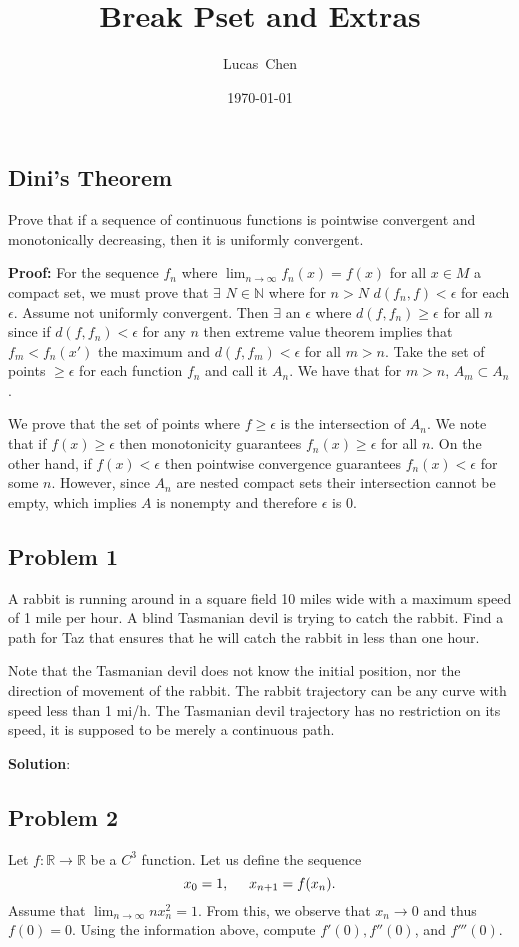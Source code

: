 \documentclass{amsart}
\title{Break Pset and Extras}
\author{Lucas\ Chen}
\date{\today}
\begin{document}
\maketitle

\subsection*{Dini's Theorem} Prove that if a sequence of continuous functions is pointwise convergent and monotonically decreasing, then it is uniformly convergent.

\medskip \noindent \textbf{Proof:} For the sequence $f_n$ where $\lim_{n\to\infty}f_n(x)=f(x)$ for all $x\in M$ a compact set, we must prove that $\exists$ $N\in\mathbb{N}$ where for $n>N$ $d(f_n, f)<\epsilon$ for each $\epsilon$. 
Assume not uniformly convergent. Then $\exists$ an $\epsilon$ where $d(f, f_n)\geq\epsilon$ for all $n$ since if $d(f,f_n)<\epsilon$ for any $n$ then extreme value theorem implies that $f_m<f_n(x')$ the maximum and $d(f, f_m)<\epsilon$ for all $m>n$. Take the set of points $\geq\epsilon$ for each function $f_n$ and call it $A_n$. We have that for $m>n$, $A_m\subset A_n$.

\medskip \noindent We prove that the set of points where $f\geq\epsilon$ is the intersection of $A_n$. We note that if $f(x)\geq\epsilon$ then monotonicity guarantees $f_n(x)\geq \epsilon$ for all $n$. On the other hand, if $f(x)<\epsilon$ then pointwise convergence guarantees $f_n(x)<\epsilon$ for some $n$. However, since $A_n$ are nested compact sets their intersection cannot be empty, which implies $A$ is nonempty and therefore $\epsilon$ is $0$.  

\newpage

\subsection*{Problem 1} A rabbit is running around in a square field 10 miles wide with a maximum speed of 1 mile per hour. A blind Tasmanian devil is trying to catch the rabbit. Find a path for Taz that ensures that he will catch the rabbit in less than one hour.

\medskip \noindent Note that the Tasmanian devil does not know the initial position, nor the direction of movement of the rabbit. The rabbit trajectory can be any curve with speed less than 1 mi/h. The Tasmanian devil trajectory has no restriction on its speed, it is supposed to be merely a continuous path.

\medskip \noindent \textbf{Solution}: 

\newpage

\subsection*{Problem 2} Let $f: \mathbb{R} \to \mathbb{R}$ be a $C^3$ function. Let us define the sequence
\[x_0 = 1,\hspace{0.5cm}x_{n+1}=f(x_n).\]
Assume that $\lim_{n\to\infty}nx_n^2=1$. From this, we observe that $x_n\to 0$ and thus $f(0)=0$. Using the information above, compute $f'(0), f''(0)$, and $f'''(0)$. 
\end{document}
